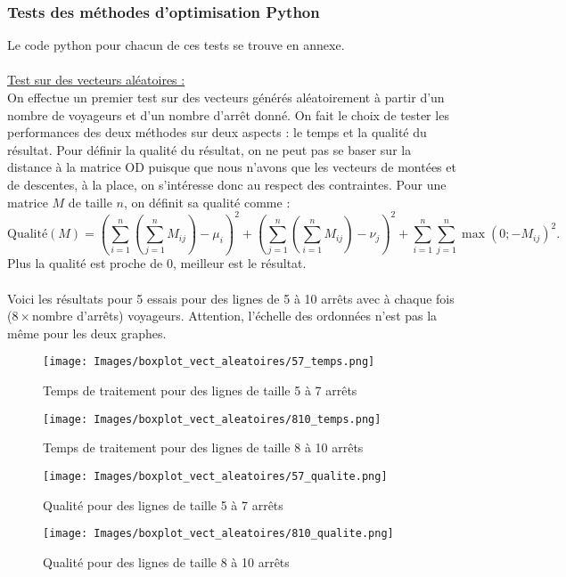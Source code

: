 \documentclass[12pt]{article}
\begin{document}
\subsubsection{Tests des méthodes d'optimisation Python}
Le code python pour chacun de ces tests se trouve en annexe.\\
\\
\underline{Test sur des vecteurs aléatoires :}\\
On effectue un premier test sur des vecteurs générés aléatoirement à partir d'un nombre de voyageurs et d'un nombre d'arrêt donné. On fait le choix de tester les performances des deux méthodes sur deux aspects : le temps et la qualité du résultat. Pour définir la qualité du résultat, on ne peut pas se baser sur la distance à la matrice OD puisque que nous n'avons que les vecteurs de montées et de descentes, à la place, on s'intéresse donc au respect des contraintes. Pour une matrice $M$ de taille $n$, on définit sa qualité comme \label{qualite} :
\[
\text{Qualité}(M) = (\sum^n_{i=1} (\sum^n_{j=1} M_{ij}) - \mu_i)^2 + (\sum^n_{j=1} (\sum^n_{i=1} M_{ij}) - \nu_j)^2 + \sum^n_{i=1}\sum^n_{j=1}\max(0;-M_{ij})^2 .
\]
Plus la qualité est proche de 0, meilleur est le résultat.\\
\\
Voici les résultats pour 5 essais pour des lignes de 5 à 10 arrêts avec à chaque fois ($8\times$nombre d'arrêts) voyageurs. Attention, l'échelle des ordonnées n'est pas la même pour les deux graphes.\\
\begin{figure}[H]
    \centering
    \texttt{[image: Images/boxplot\_vect\_aleatoires/57\_temps.png]}
    \caption{Temps de traitement pour des lignes de taille 5 à 7 arrêts}
    \label{vecteurs aleatoires temps}
\end{figure}
\begin{figure}[H]
    \centering
    \texttt{[image: Images/boxplot\_vect\_aleatoires/810\_temps.png]}
    \caption{Temps de traitement pour des lignes de taille 8 à 10 arrêts}
    \label{vecteurs aleatoires qualite}
\end{figure}
\begin{figure}[H]
    \centering
    \texttt{[image: Images/boxplot\_vect\_aleatoires/57\_qualite.png]}
    \caption{Qualité pour des lignes de taille 5 à 7 arrêts}
    \label{vecteurs aleatoires temps}
\end{figure}
\begin{figure}[H]
    \centering
    \texttt{[image: Images/boxplot\_vect\_aleatoires/810\_qualite.png]}
    \caption{Qualité pour des lignes de taille 8 à 10 arrêts}
    \label{vecteurs aleatoires qualite}
\end{figure}
\end{document}
